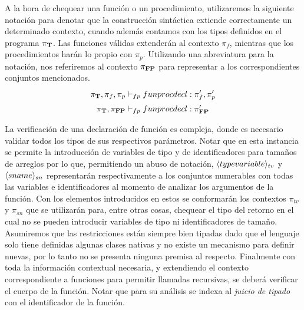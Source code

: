 
A la hora de chequear una función o un procedimiento, utilizaremos la siguiente notación para denotar que la construcción sintáctica extiende correctamente un determinado contexto, cuando además contamos con los tipos definidos en el programa $\pi_{\mathbf{T}}$.
Las funciones válidas extenderán al contexto $\pi_{f}$, mientras que los procedimientos harán lo propio con $\pi_{p}$.
Utilizando una abreviatura para la notación, nos referiremos al contexto $\pi_{\mathbf{FP}}$ para representar a los correspondientes conjuntos mencionados.
\begin{gather*}
\PI{T}, \pi_{f}, \pi_{p} \DASH{fp} funprocdecl : \pi'_{f}, \pi'_{p}
\\
\PI{T}, \PI{FP} \DASH{fp} funprocdecl : \PI{FP}'
\end{gather*}

La verificación de una declaración de función es compleja, donde es necesario validar todos los tipos de sus respectivos parámetros.
Notar que en esta instancia se permite la introducción de variables de tipo y de identificadores para tamaños de arreglos por lo que, permitiendo un abuso de notación, $\langle typevariable \rangle_{tv}$ y $\langle sname \rangle_{sn}$ representarán respectivamente a los conjuntos numerables con todas las variables e identificadores al momento de analizar los argumentos de la función.
Con los elementos introducidos en estos se conformarán los contextos $\pi_{tv}$ y $\pi_{sn}$ que se utilizarán para, entre otras cosas, chequear el tipo del retorno en el cual no se pueden introducir variables de tipo ni identificadores de tamaño.
Asumiremos que las restricciones están siempre bien tipadas dado que el lenguaje solo tiene definidas algunas clases nativas y no existe un mecanismo para definir nuevas, por lo tanto no se presenta ninguna premisa al respecto.
Finalmente con toda la información contextual necesaria, y extendiendo el contexto correspondiente a funciones para permitir llamadas recursivas, se deberá verificar el cuerpo de la función.
Notar que para su análisis se indexa al \textit{juicio de tipado} con el identificador de la función.

